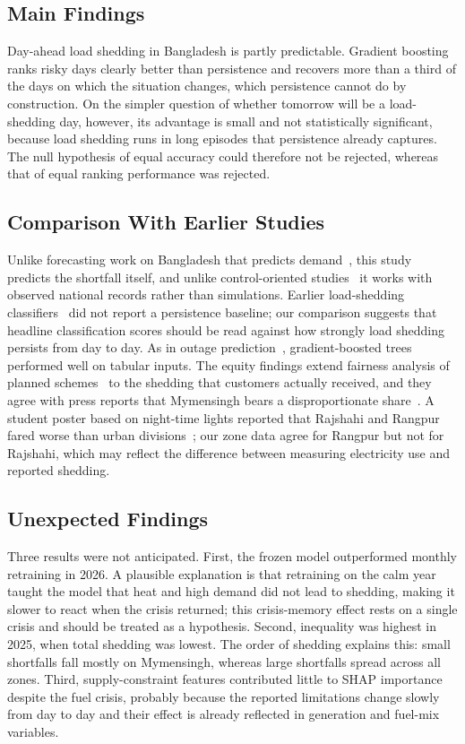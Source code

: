 \documentclass[conference]{IEEEtran}
\begin{document}
\subsection{Main Findings}
Day-ahead load shedding in Bangladesh is partly predictable. Gradient boosting ranks risky days clearly better than persistence and recovers more than a third of the days on which the situation changes, which persistence cannot do by construction. On the simpler question of whether tomorrow will be a load-shedding day, however, its advantage is small and not statistically significant, because load shedding runs in long episodes that persistence already captures. The null hypothesis of equal accuracy could therefore not be rejected, whereas that of equal ranking performance was rejected.

\subsection{Comparison With Earlier Studies}
Unlike forecasting work on Bangladesh that predicts demand~\cite{akhter2024}, this study predicts the shortfall itself, and unlike control-oriented studies~\cite{zhou2024,gain2025} it works with observed national records rather than simulations. Earlier load-shedding classifiers~\cite{rahman2016,arifuzzaman2026,akinola2024} did not report a persistence baseline; our comparison suggests that headline classification scores should be read against how strongly load shedding persists from day to day. As in outage prediction~\cite{wanik2015,taylor2023}, gradient-boosted trees performed well on tabular inputs. The equity findings extend fairness analysis of planned schemes~\cite{heylen2018} to the shedding that customers actually received, and they agree with press reports that Mymensingh bears a disproportionate share~\cite{dailystar2026}. A student poster based on night-time lights reported that Rajshahi and Rangpur fared worse than urban divisions~\cite{mitchell2026}; our zone data agree for Rangpur but not for Rajshahi, which may reflect the difference between measuring electricity use and reported shedding.

\subsection{Unexpected Findings}
Three results were not anticipated. First, the frozen model outperformed monthly retraining in 2026. A plausible explanation is that retraining on the calm year taught the model that heat and high demand did not lead to shedding, making it slower to react when the crisis returned; this crisis-memory effect rests on a single crisis and should be treated as a hypothesis. Second, inequality was highest in 2025, when total shedding was lowest. The order of shedding explains this: small shortfalls fall mostly on Mymensingh, whereas large shortfalls spread across all zones. Third, supply-constraint features contributed little to SHAP importance despite the fuel crisis, probably because the reported limitations change slowly from day to day and their effect is already reflected in generation and fuel-mix variables.
\end{document}
